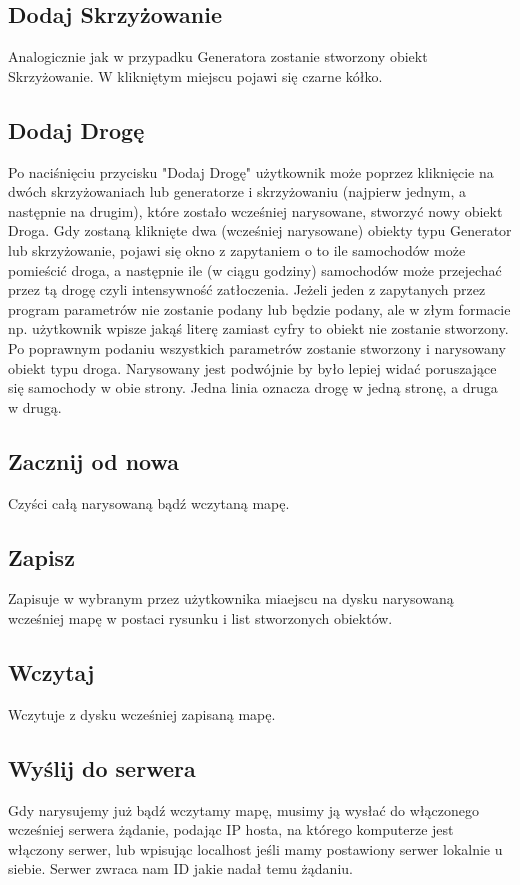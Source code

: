 \documentclass{article}
\begin{document}
\subsection{Dodaj Skrzyżowanie}
    Analogicznie jak w przypadku Generatora zostanie stworzony obiekt Skrzyżowanie. W klikniętym miejscu pojawi się czarne kółko.

\subsection{Dodaj Drogę}
    Po naciśnięciu przycisku "Dodaj Drogę" użytkownik może poprzez kliknięcie na dwóch skrzyżowaniach lub generatorze i skrzyżowaniu (najpierw jednym, a następnie na drugim), które zostało wcześniej narysowane, stworzyć nowy obiekt Droga. Gdy zostaną kliknięte dwa (wcześniej narysowane) obiekty typu Generator lub skrzyżowanie, pojawi się okno z zapytaniem o to ile samochodów może pomieścić droga, a następnie ile (w ciągu godziny) samochodów może przejechać przez tą drogę czyli intensywność zatłoczenia. Jeżeli jeden z zapytanych przez program parametrów nie zostanie podany lub będzie podany, ale w złym formacie np. użytkownik wpisze jakąś literę zamiast cyfry to obiekt nie zostanie stworzony. Po poprawnym podaniu wszystkich parametrów zostanie stworzony i narysowany obiekt typu droga. Narysowany jest podwójnie by było lepiej widać poruszające się samochody w obie strony. Jedna linia oznacza drogę w jedną stronę, a druga w drugą.

\subsection{Zacznij od nowa}
    Czyści całą narysowaną bądź wczytaną mapę.

\subsection{Zapisz}
    Zapisuje w wybranym przez użytkownika miaejscu na dysku narysowaną wcześniej mapę w postaci rysunku i list stworzonych obiektów.

\subsection{Wczytaj}
    Wczytuje z dysku wcześniej zapisaną mapę.

\subsection{Wyślij do serwera}
    Gdy narysujemy już bądź wczytamy mapę, musimy ją wysłać do włączonego wcześniej serwera żądanie, podając IP hosta, na którego komputerze jest włączony serwer, lub wpisując localhost jeśli mamy postawiony serwer lokalnie u siebie. Serwer zwraca nam ID jakie nadał temu żądaniu.
\end{document}
